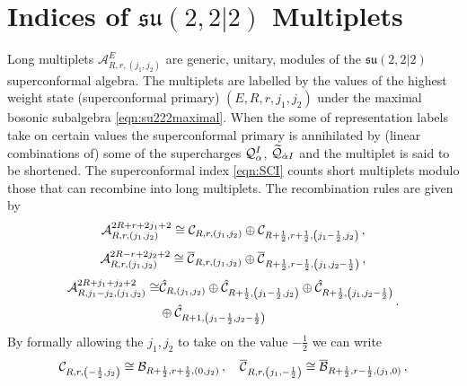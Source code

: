 \documentclass[main.tex]{subfiles}
\begin{document}
\section{Indices of \texorpdfstring{$\mathfrak{su}(2,2|2)$}{su(2,2|2)} Multiplets}\label{sec:indicies}
\renewcommand{\arraystretch}{1.2}
Long multiplets $\mathcal{A}^{E}_{R,r,(j_1,j_2)}$ are generic, unitary, modules of the $\mathfrak{su}(2,2|2)$ superconformal algebra. The multiplets are labelled by the values of the highest weight state (superconformal primary) $(E,R,r,j_1,j_2)$ under the maximal bosonic subalgebra \eqref{eqn:su222maximal}. When the some of representation labels take on certain values the superconformal primary is annihilated by (linear combinations of) some of the supercharges $\mathcal{Q}_{\alpha}^I$, $\widetilde{\mathcal{Q}}_{\dot{\alpha} I}$ and the multiplet is said to be shortened. The superconformal index \eqref{eqn:SCI} counts short multiplets modulo those that can recombine into long multiplets. The recombination rules are given by \cite{DolanOsborn}
\begin{equation}
\mathcal{A}_{R,r,(j_1,j_2)}^{2R+r+2j_1+2}\cong \mathcal{C}_{R,r,(j_1,j_2)}\oplus\mathcal{C}_{R+\frac{1}{2},r+\frac{1}{2},\left(j_1-\frac{1}{2},j_2\right)}\label{eqn:short1} \, , 
\end{equation}
\begin{equation}
\mathcal{A}_{R,r,(j_1,j_2)}^{2R-r+2j_2+2}\cong \overline{\mathcal{C}}_{R,r,(j_1,j_2)}\oplus\overline{\mathcal{C}}_{R+\frac{1}{2},r-\frac{1}{2},\left(j_1,j_2-\frac{1}{2}\right)} \, , 
\end{equation}
\begin{equation}
\begin{aligned}\mathcal{A}_{R,j_1-j_2,(j_1,j_2)}^{2R+j_1+j_2+2}\cong& \hat{\mathcal{C}}_{R,(j_1,j_2)}\oplus\hat{\mathcal{C}}_{R+\frac{1}{2},\left(j_1-\frac{1}{2},j_2\right)}\oplus\hat{\mathcal{C}}_{R+\frac{1}{2},\left(j_1,j_2-\frac{1}{2}\right)}\\
&\oplus\hat{\mathcal{C}}_{R+1,\left(j_1-\frac{1}{2},j_2-\frac{1}{2}\right)}\end{aligned}\,.
\end{equation}
By formally allowing the $j_1,j_2$ to take on the value $-\frac{1}{2}$ we can write
\begin{equation}
\mathcal{C}_{R,r,\left(-\frac{1}{2},j_2\right)}\cong\mathcal{B}_{R+\frac{1}{2},r+\frac{1}{2},(0,j_2)}\,,\quad\overline{\mathcal{C}}_{R,r,\left(j_1,-\frac{1}{2}\right)}\cong\overline{\mathcal{B}}_{R+\frac{1}{2},r-\frac{1}{2},(j_1,0)}\,,\label{eqn:Semishort}
\end{equation}
\end{document}
